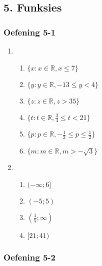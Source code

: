{\begin{multicols}{3}
\begin{enumerate}[noitemsep, label=\textbf{\arabic*}. ]
\end{enumerate}
\end{multicols}


\subsection* {5. Funksies}
\begin{multicols}{3}
\subsubsection*{Oefening 5-1} %

\begin{enumerate}[noitemsep, label=\textbf{\arabic*}. ] 


\item %
\begin{enumerate}[noitemsep, label=\textbf{(\alph*)} ] 
 \item $\{x:x\in\mathbb{R}, x\leq7\}$ %
\item $\{y:y\in\mathbb{R}, -13 \leq y<4\}$ %
\item $\{z:z\in\mathbb{R}, z>35\}$ %
\item $\{t:t\in\mathbb{R}, \frac{3}{4}\leq t <21\}$ %
\item $\{p:p\in\mathbb{R}, -\frac{1}{2}\leq p \leq \frac{1}{2}\}$ %
\item $\{m:m\in\mathbb{R}, m > -\sqrt{3}\}$  %
\end{enumerate}

\item %
\begin{enumerate}[noitemsep, label=\textbf{(\alph*)} ] 
 \item $(-\infty; 6]$ %
 \item $(-5; 5)$ %
 \item $(\frac{1}{5}; \infty)$%
 \item $[21; 41)$%
\end{enumerate}
\end{enumerate}

\subsubsection*{Oefening 5-2} %


\end{multicols}}
